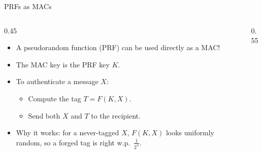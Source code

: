 \ifdefined\PRESENTATION\else\PassOptionsToClass{handout}{beamer}\fi\documentclass[aspectratio=169, lualatex]{beamer}
\begin{document}
\begin{frame}{PRFs as MACs}
	\begin{columns}[c]
		\begin{column}{0.45\textwidth}
			\begin{itemize}
				\item A pseudorandom function (PRF) can be used directly as a MAC!
				\item The MAC key is the PRF key $K$.
				\item To authenticate a message $X$:
				      \begin{itemize}
					      \item Compute the tag $T = F(K, X)$.
					      \item Send both $X$ and $T$ to the recipient.
				      \end{itemize}
				\item Why it works: for a never-tagged $X$, $F(K, X)$ looks uniformly random, so a forged tag is right w.p.\ $\frac{1}{2^\lambda}$.
			\end{itemize}
		\end{column}
		\begin{column}{0.55\textwidth}
			\begin{flushright}
			\end{flushright}
		\end{column}
	\end{columns}
\end{frame}
\end{document}
